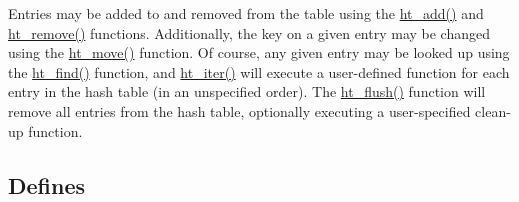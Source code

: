 Entries may be added to and removed from the table using the \hyperlink{group__dbprim__hash_a7}{ht\_\-add()} and \hyperlink{group__dbprim__hash_a9}{ht\_\-remove()} functions. Additionally, the key on a given entry may be changed using the \hyperlink{group__dbprim__hash_a8}{ht\_\-move()} function. Of course, any given entry may be looked up using the \hyperlink{group__dbprim__hash_a10}{ht\_\-find()} function, and \hyperlink{group__dbprim__hash_a11}{ht\_\-iter()} will execute a user-defined function for each entry in the hash table (in an unspecified order). The \hyperlink{group__dbprim__hash_a12}{ht\_\-flush()} function will remove all entries from the hash table, optionally executing a user-specified clean-up function. \subsection*{Defines}
